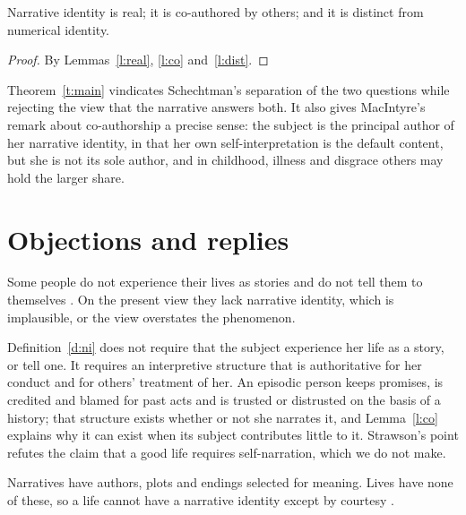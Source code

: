 \documentclass{situationist-preprint}
\begin{document}
\begin{theorem}\label{t:main}
Narrative identity is real; it is co-authored by others; and it is distinct from numerical identity.
\end{theorem}

\begin{proof}
By Lemmas~\ref{l:real}, \ref{l:co} and~\ref{l:dist}.
\end{proof}

Theorem~\ref{t:main} vindicates Schechtman's separation of the two questions while rejecting the view that the narrative answers both. It also gives MacIntyre's remark about co-authorship a precise sense: the subject is the principal author of her narrative identity, in that her own self-interpretation is the default content, but she is not its sole author, and in childhood, illness and disgrace others may hold the larger share.

\section{Objections and replies}

\begin{objection}
Some people do not experience their lives as stories and do not tell them to themselves \citep{GStrawson2004}. On the present view they lack narrative identity, which is implausible, or the view overstates the phenomenon.
\end{objection}

\begin{reply}
Definition~\ref{d:ni} does not require that the subject experience her life as a story, or tell one. It requires an interpretive structure that is authoritative for her conduct and for others' treatment of her. An episodic person keeps promises, is credited and blamed for past acts and is trusted or distrusted on the basis of a history; that structure exists whether or not she narrates it, and Lemma~\ref{l:co} explains why it can exist when its subject contributes little to it. Strawson's point refutes the claim that a good life requires self-narration, which we do not make.
\end{reply}

\begin{objection}
Narratives have authors, plots and endings selected for meaning. Lives have none of these, so a life cannot have a narrative identity except by courtesy \citep{Lamarque2004}.
\end{objection}
\end{document}
